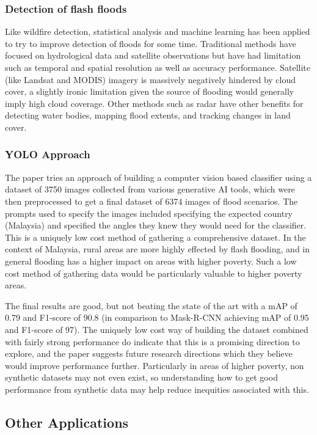 \documentclass[conference,a4paper]{IEEEtran}
\begin{document}
\subsubsection{Detection of flash floods}

Like wildfire detection, statistical analysis and machine learning has been applied to try to improve detection of floods for some time. Traditional methods have focused on hydrological data and satellite observations but have had limitation such as temporal and spatial resolution as well as accuracy performance. Satellite (like Landsat and MODIS) imagery is massively negatively hindered by cloud cover, a slightly ironic limitation given the source of flooding would generally imply high cloud coverage. Other methods such as radar have other benefits for detecting water bodies, mapping flood extents, and tracking changes in land cover.

\subsubsection{YOLO Approach}

The paper tries an approach of building a computer vision based classifier using a dataset of 3750 images collected from various generative AI tools, which were then preprocessed to get a final dataset of 6374 images of flood scenarios. The prompts used to specify the images included specifying the expected country (Malaysia) and specified the angles they knew they would need for the classifier. This is a uniquely low cost method of gathering a comprehensive dataset. In the context of Malaysia, rural areas are more highly effected by flash flooding, and in general flooding has a higher impact on areas with higher poverty. Such a low cost method of gathering data would be particularly valuable to higher poverty areas.

The final results are good, but not beating the state of the art with a mAP of 0.79 and F1-score of 90.8 (in comparison to Mask-R-CNN achieving mAP of 0.95 and F1-score of 97). The uniquely low cost way of building the dataset combined with fairly strong performance do indicate that this is a promising direction to explore, and the paper suggests future research directions which they believe would improve performance further. Particularly in areas of higher poverty, non synthetic datasets may not even exist, so understanding how to get good performance from synthetic data may help reduce inequities associated with this.


\subsection{Other Applications}
\end{document}
